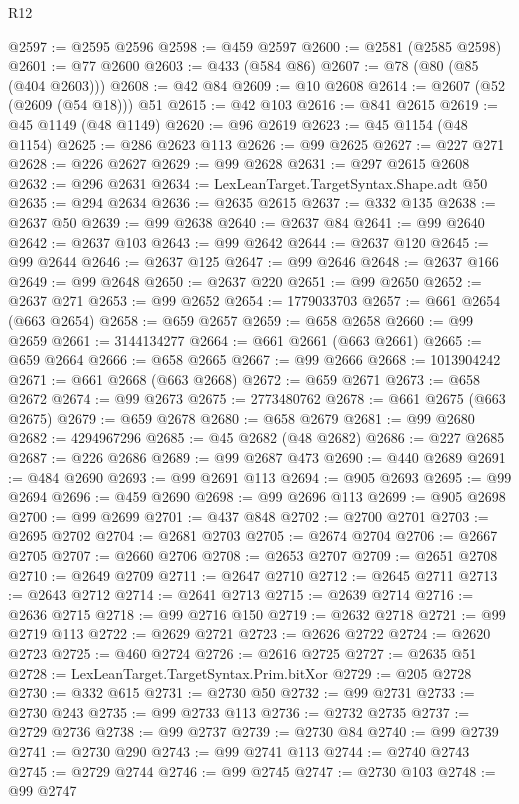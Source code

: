\begin{lexlean}{R12}
\begin{coremodule}
{{{{{{{{{{{{{{{{{{{{{{{{{{{{{{{{{{{{{{{{{{{{{{{{{{{{{{{{{{{{{{{{{{{{{{{{{{{{{{{{{{{{{{{{{{{{{{{{{{{{{{{{{{@2597 := @2595 @2596
@2598 := @459 @2597
@2600 := @2581 (@2585 @2598)
@2601 := @77 @2600
@2603 := @433 (@584 @86)
@2607 := @78 (@80 (@85 (@404 @2603)))
@2608 := @42 @84
@2609 := @10 @2608
@2614 := @2607 (@52 (@2609 (@54 @18))) @51
@2615 := @42 @103
@2616 := @841 @2615
@2619 := @45 @1149 (@48 @1149)
@2620 := @96 @2619
@2623 := @45 @1154 (@48 @1154)
@2625 := @286 @2623 @113
@2626 := @99 @2625
@2627 := @227 @271
@2628 := @226 @2627
@2629 := @99 @2628
@2631 := @297 @2615 @2608
@2632 := @296 @2631
@2634 := LexLeanTarget.TargetSyntax.Shape.adt @50
@2635 := @294 @2634
@2636 := @2635 @2615
@2637 := @332 @135
@2638 := @2637 @50
@2639 := @99 @2638
@2640 := @2637 @84
@2641 := @99 @2640
@2642 := @2637 @103
@2643 := @99 @2642
@2644 := @2637 @120
@2645 := @99 @2644
@2646 := @2637 @125
@2647 := @99 @2646
@2648 := @2637 @166
@2649 := @99 @2648
@2650 := @2637 @220
@2651 := @99 @2650
@2652 := @2637 @271
@2653 := @99 @2652
@2654 := 1779033703
@2657 := @661 @2654 (@663 @2654)
@2658 := @659 @2657
@2659 := @658 @2658
@2660 := @99 @2659
@2661 := 3144134277
@2664 := @661 @2661 (@663 @2661)
@2665 := @659 @2664
@2666 := @658 @2665
@2667 := @99 @2666
@2668 := 1013904242
@2671 := @661 @2668 (@663 @2668)
@2672 := @659 @2671
@2673 := @658 @2672
@2674 := @99 @2673
@2675 := 2773480762
@2678 := @661 @2675 (@663 @2675)
@2679 := @659 @2678
@2680 := @658 @2679
@2681 := @99 @2680
@2682 := 4294967296
@2685 := @45 @2682 (@48 @2682)
@2686 := @227 @2685
@2687 := @226 @2686
@2689 := @99 @2687 @473
@2690 := @440 @2689
@2691 := @484 @2690
@2693 := @99 @2691 @113
@2694 := @905 @2693
@2695 := @99 @2694
@2696 := @459 @2690
@2698 := @99 @2696 @113
@2699 := @905 @2698
@2700 := @99 @2699
@2701 := @437 @848
@2702 := @2700 @2701
@2703 := @2695 @2702
@2704 := @2681 @2703
@2705 := @2674 @2704
@2706 := @2667 @2705
@2707 := @2660 @2706
@2708 := @2653 @2707
@2709 := @2651 @2708
@2710 := @2649 @2709
@2711 := @2647 @2710
@2712 := @2645 @2711
@2713 := @2643 @2712
@2714 := @2641 @2713
@2715 := @2639 @2714
@2716 := @2636 @2715
@2718 := @99 @2716 @150
@2719 := @2632 @2718
@2721 := @99 @2719 @113
@2722 := @2629 @2721
@2723 := @2626 @2722
@2724 := @2620 @2723
@2725 := @460 @2724
@2726 := @2616 @2725
@2727 := @2635 @51
@2728 := LexLeanTarget.TargetSyntax.Prim.bitXor
@2729 := @205 @2728
@2730 := @332 @615
@2731 := @2730 @50
@2732 := @99 @2731
@2733 := @2730 @243
@2735 := @99 @2733 @113
@2736 := @2732 @2735
@2737 := @2729 @2736
@2738 := @99 @2737
@2739 := @2730 @84
@2740 := @99 @2739
@2741 := @2730 @290
@2743 := @99 @2741 @113
@2744 := @2740 @2743
@2745 := @2729 @2744
@2746 := @99 @2745
@2747 := @2730 @103
@2748 := @99 @2747
}}}}}}}}}}}}}}}}}}}}}}}}}}}}}}}}}}}}}}}}}}}}}}}}}}}}}}}}}}}}}}}}}}}}}}}}}}}}}}}}}}}}}}}}}}}}}}}}}}}}}}}}}}
\end{coremodule}
\end{lexlean}
